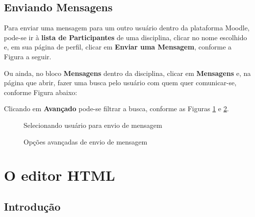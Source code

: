 \section{Enviando Mensagens}
Para enviar uma mensagem para um outro usuário dentro da plataforma Moodle, pode-se ir à \textbf{lista de Participantes} de uma disciplina, clicar no nome escolhido e, em sua página de perfil, clicar em \textbf{Enviar uma Mensagem}, conforme a Figura a seguir.


 \begin{center}
 \end{center}

Ou ainda, no bloco \textbf{Mensagens} dentro da disciplina, clicar em \textbf{Mensagens} e, na página que abrir, fazer uma busca pelo usuário com quem quer comunicar-se, conforme Figura abaixo:


 \begin{center}
 \end{center}


Clicando em \textbf{Avançado} pode-se filtrar a busca, conforme as Figuras \ref{fig:cap2_20} e \ref{fig:cap2_21}.

\begin{figure}[htbp]
 \begin{center}
  \caption{Selecionando usuário para envio de mensagem}
  \label{fig:cap2_20}
 \end{center}
\end{figure}

\begin{figure}[htbp]
 \begin{center}
  \caption{Opções avançadas de envio de mensagem}
  \label{fig:cap2_21}
 \end{center}
\end{figure}




\chapter{O editor HTML}


\section{Introdução}

